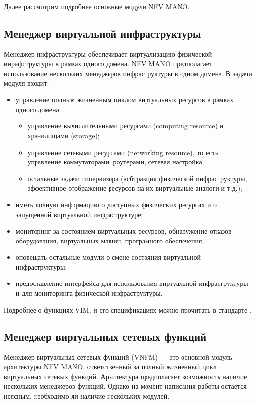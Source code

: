 \documentclass[oneside,final,14pt,a4paper]{extreport}
\begin{document}
Далее рассмотрим подробнее основные модули NFV MANO.

\subsection{Менеджер виртуальной инфраструктуры}
Менеджер инфраструктуры обеспечивает виртуализацию физической инрафструктуры в рамках одного домена. NFV MANO предполагает использование нескольких менеджеров инфраструктуры в одном домене. В задачи модуля входит:

\begin{itemize}
	\item управление полным жизненным циклом виртуальных ресурсов в рамках одного домена
	\begin{itemize}
		\item управление вычислительными ресурсами (computing resource) и хранилищами (storage);
		\item управление сетевыми ресурсами (networking resource), то есть управление коммутаторами, роутерами, сетевая настройка;
		\item остальные задачи гипервизора (асбтракция физической инфраструктуры, эффективное отображение ресурсов на их виртуальные аналоги и т.д.);
	\end{itemize}
	\item иметь полную информацию о доступных физических ресурсах и о запущенной виртуальной инфраструктуре;
	\item мониторинг за состоянием виртуальных ресурсов, обнаружение отказов оборудования, виртуальных машин, програмного обеспечения;
	\item оповещать остальные модули о смене состояния виртуальной инфраструктуры;
	\item предоставление интерфейса для использования виртуальной инфраструктуры и для мониторинга физической инфраструктуры.
\end{itemize}

Подробнее о функциях VIM, и его спецификациях можно прочитать в стандарте \cite{nfv-mano-official-2016-04}.

\subsection{Менеджер виртуальных сетевых функций}
Менеджер виртуальных сетевых функций (VNFM) --- это основной модуль архитектуры NFV MANO, ответственный за  полный жизненный цикл виртуальных сетевых функций. Архитектура предполагает возможность наличие нескольких менеджеров функций. Однако на момент написания работы остается неясным, необходимо ли наличие нескольких модулей.
\end{document}
